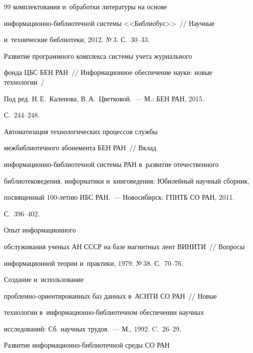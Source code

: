 {{\begin{thebibliography}{99}
комплектования и~обработки литературы на основе  


ин\-фор\-ма\-ци\-он\-но-биб\-лио\-теч\-ной системы <<Библиобус>>~/\!\!/ Научные 


и~технические библиотеки, 2012. №\,3. С.~30--33.




 Развитие программного комплекса системы учета журнального 


фонда ЦБС БЕН РАН~/\!\!/ Информационное обеспечение науки: новые технологии~/ 


Под ред. Н.\,Е.~Каленова, В.\,А.~Цветковой.~--- М.: БЕН РАН, 2015. 


С.~244--248.




 Автоматизация технологических процессов службы 


межбиблиотечного абонемента БЕН РАН~/\!\!/ Вклад  


ин\-фор\-ма\-ци\-он\-но-биб\-лио\-теч\-ной системы РАН в~развитие отечественного 


библиотековедения, информатики и~книговедения: Юбилейный научный сборник, 


посвященный 100-ле\-тию ИБС РАН.~--- Новосибирск: ГПНТБ СО РАН, 2011.  


С.~396--402.




 Опыт информационного 


обслуживания ученых АН СССР на базе магнитных лент ВИНИТИ~/\!\!/ Вопросы 


информационной теории и~практики, 1979. №\,38. С.~70--76.




 Создание и~использование  


проб\-лем\-но-ори\-ен\-ти\-ро\-ван\-ных баз данных в~АСНТИ СО РАН~/\!\!/ Новые 


технологии в~ин\-фор\-ма\-ци\-он\-но-биб\-лио\-теч\-ном обеспечении научных 


исследований: Сб. научных трудов.~--- М., 1992. C.~26--29. 




 Развитие информационно-библиотечной среды СО РАН 



\end{thebibliography}}}
